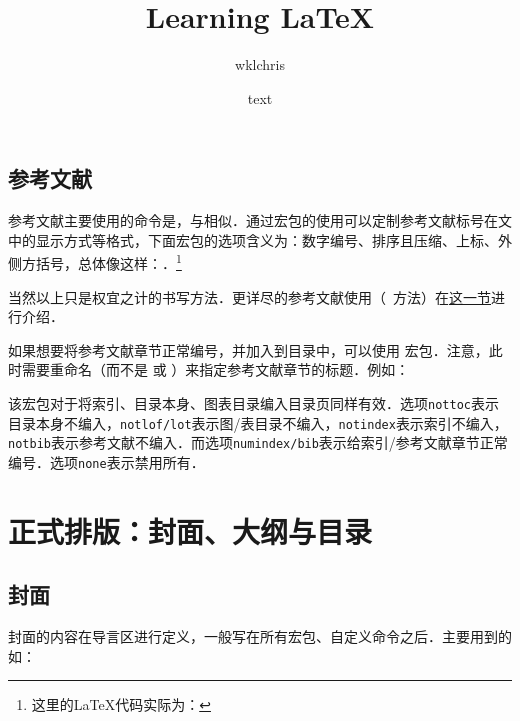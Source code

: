 \subsection{参考文献}
\label{subsec:cite}
参考文献主要使用的命令是，与相似．通过宏包的使用可以定制参考文献标号在文中的显示方式等格式，下面宏包的选项含义为：数字编号、排序且压缩、上标、外侧方括号，总体像这样：\textsuperscript{\ttfamily [1,3-5]}．\footnote{这里的LaTeX代码实际为：}

当然以上只是权宜之计的书写方法．更详尽的参考文献使用（\bibtex\ 方法）在\hyperref[sec:bibtex]{\bibtex{}这一节}进行介绍．

如果想要将参考文献章节正常编号，并加入到目录中，可以使用  宏包\label{pkg:tocbibind}．注意，此时需要重命名（而不是  或 ）来指定参考文献章节的标题．例如：
\begin{latex}
\usepackage[nottoc,numbib]{tocbibind}
\renewcommand{\tocbibname}{References}
\end{latex}

该宏包对于将索引、目录本身、图表目录编入目录页同样有效．选项\texttt{nottoc}表示目录本身不编入，\texttt{notlof/lot}表示图/表目录不编入，\texttt{notindex}表示索引不编入，\texttt{notbib}表示参考文献不编入．而选项\texttt{numindex/bib}表示给索引/参考文献章节正常编号．选项\texttt{none}表示禁用所有．

\section{正式排版：封面、大纲与目录}

\subsection{封面}
封面的内容在导言区进行定义，一般写在所有宏包、自定义命令之后．主要用到的如：
\begin{latex}
\title{Learning LaTeX}
\author{wklchris}
\date{text}
\end{latex}

